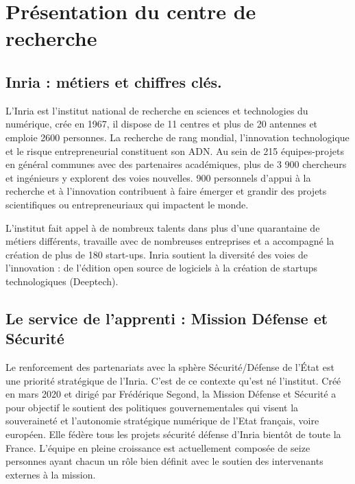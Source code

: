 

\section{Présentation du centre de recherche}
\label{chap:sectionone}

\subsection{Inria : métiers et chiffres clés.}

L’Inria est l’institut national de recherche en sciences et technologies du numérique, crée en 1967, il dispose de 11 centres et plus de 20 antennes et emploie 2600 personnes. La recherche de rang mondial, l’innovation technologique et le risque entrepreneurial constituent son ADN.
Au sein de 215 équipes-projets en général communes avec des partenaires académiques, plus de 3 900 chercheurs et ingénieurs y explorent des voies nouvelles. 900 personnels d’appui à la recherche et à l’innovation contribuent à faire émerger et grandir des projets scientifiques ou entrepreneuriaux qui impactent le monde.

L’institut fait appel à de nombreux talents dans plus d’une quarantaine de métiers différents, travaille avec de nombreuses entreprises et a accompagné la création de plus de 180 start-ups.
Inria soutient la diversité des voies de l’innovation : de l’édition open source de logiciels à la création de startups technologiques (Deeptech).


\subsection{Le service de l’apprenti : Mission Défense et Sécurité}

Le renforcement des partenariats avec la sphère Sécurité/Défense de l’État est une priorité stratégique de l’Inria. C’est de ce contexte qu’est né l’institut. Créé en mars 2020 et dirigé par Frédérique Segond, la Mission Défense et Sécurité a pour objectif le soutient des politiques gouvernementales qui visent la souveraineté et l’autonomie stratégique numérique de l’Etat français, voire européen. Elle fédère tous les projets sécurité défense d’Inria bientôt de toute la France.
L’équipe en pleine croissance est actuellement composée de seize personnes ayant chacun un rôle bien définit avec le soutien des intervenants externes à la mission.

